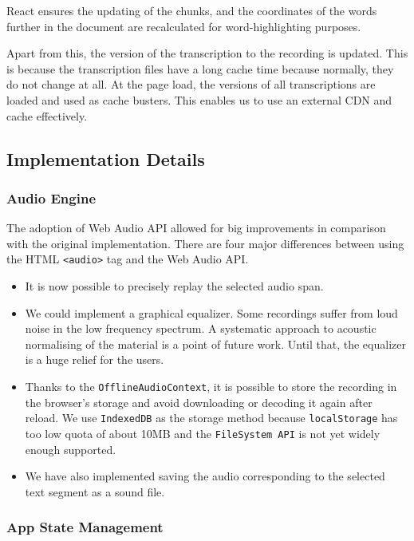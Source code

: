 \documentclass{svproc}
\begin{document}
React ensures the updating of the chunks, and the coordinates of the words
further in the document are recalculated for word-highlighting purposes.

Apart from this, the version of the transcription to the recording is updated.
This is because the transcription files have a long cache time because normally,
they do not change at all. At the page load, the versions of all transcriptions
are loaded and used as cache busters. This enables us to use an external CDN and
cache effectively.

\subsection{Implementation Details}

\subsubsection{Audio Engine}

The adoption of Web Audio API\cite{adenot2013web} allowed for big improvements
in comparison with the original implementation. There are four major differences
between using the HTML \texttt{<audio>} tag and the Web Audio API.

\begin{itemize}
\item{It is now possible to precisely replay the selected audio span.}
\item{
    We could implement a graphical equalizer. Some recordings suffer from loud
    noise in the low frequency spectrum. A systematic approach to acoustic
    normalising of the material is a point of future work. Until that, the
    equalizer is a huge relief for the users.
}
\item{
    Thanks to the \texttt{OfflineAudioContext}, it is possible to store the
    recording in the browser's storage and avoid downloading or decoding it
    again after reload. We use \texttt{IndexedDB} as the storage method because
    \texttt{localStorage} has too low quota of about 10MB and the
    \texttt{FileSystem API} is not yet widely enough supported.
}
\item{
    We have also implemented saving the audio corresponding to the selected text
    segment as a sound file.
}
\end{itemize}

\subsubsection{App State Management}
\end{document}
